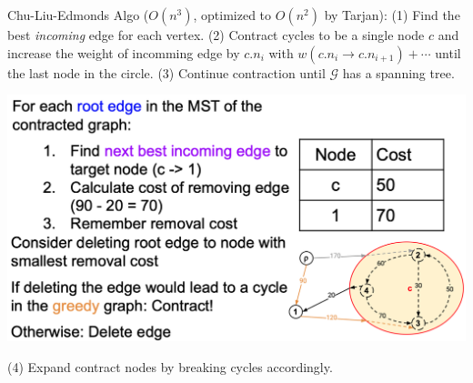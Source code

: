 Chu-Liu-Edmonds Algo ($O(n^3)$, optimized to $O(n^2)$ by Tarjan): \quad
(1) Find the best \emph{incoming} edge for each vertex. 
(2) Contract cycles to be a single node $c$ and increase the weight of incomming edge by $c.n_{i}$ with $w(c.n_{i}\to c.n_{i+1})+\cdots$ until the last node in the circle. 
(3) Continue contraction until $\mathcal{G}$ has a spanning tree. 

\vspace{-0.4cm}
\begin{center}
    \includegraphics[width=\columnwidth]{img/root-remove.png}
\end{center}
\vspace{-0.5cm}

(4) Expand contract nodes by breaking cycles accordingly.
